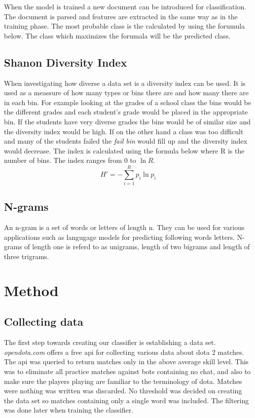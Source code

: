 \documentclass[12pt,a4paper]{article}
\begin{document}
When the model is trained a new document can be introduced for classification.
The document is parsed and features are extracted in the same way as in the training phase.
The most probable class is the calculated by using the forumula below.
The class which maximizes the forumala will be the predicted class.

\subsection{Shanon Diversity Index}
When investigating how diverse a data set is a diversity index can be used.
It is used as a meassure of how many types or bins there are and how many there are in each bin.
For example looking at the grades of a school class the bins would be the different grades
and each student's grade would be placed in the appropriate bin.
If the students have very diverse grades the bins would be of similar size and the diversity index would be high.
If on the other hand a class was too difficult and many of the students failed the \textit{fail bin} would fill up
and the diversity index would decrease.
The index is calculated using the formula below where R is the number of bins. The index ranges from $0$ to $\ln{R}$.
$$H' = -\sum_{i=1}^{R}p_i \ln{p_i}$$

\subsection{N-grams}
An n-gram is a set of words or letters of length n.
They can be used for various applications such as langugage models for predicting following words letters.
N-grams of length one is referd to as unigrams, length of two bigrams and length of three trigrams.

\section{Method}
\subsection{Collecting data}
The first step towards creating our classifier is establishing a data set.
\textit{opendota.com} offers a free api for collecting various data about dota 2 matches.
The api was queried to return matches only in the above average skill level.
This was to eliminate all practice matches against bots containing no chat,
and also to make sure the players playing are familiar to the terminology of dota.
Matches were nothing was written was discarded.
No threshold was decided on creating the data set so matches containing only a single word was included.
The filtering was done later when training the classifier.
\end{document}

